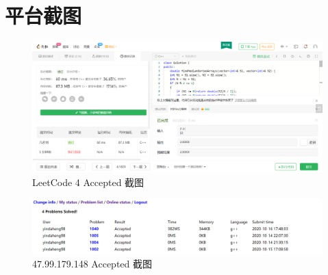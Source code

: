 \section{平台截图}
\begin{figure}[htbp]
    \centering
    \includegraphics[width=1\textwidth]{leetcode.png}
    \caption{LeetCode 4 Accepted 截图}
    \label{fig:leetcode}
\end{figure}
\begin{figure}[htbp]
    \centering
    \includegraphics[width=1\textwidth]{OJ.png}
    \caption{47.99.179.148 Accepted 截图}
    \label{fig:leetcode}
\end{figure}